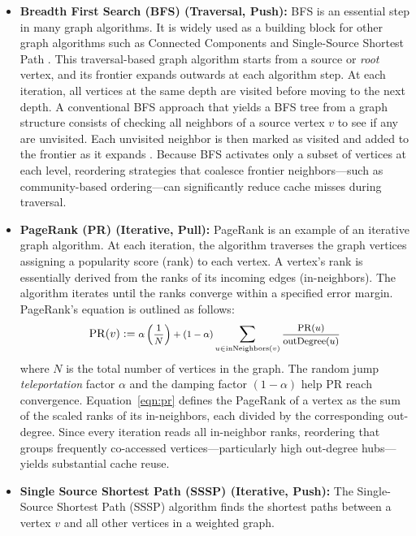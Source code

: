 \documentclass[sigconf, nonacm]{acmart}
\DeclareMathOperator{\PR}{PR}
\DeclareMathOperator{\inNeighbors}{inNeighbors}
\DeclareMathOperator{\outDegree}{outDegree}
\DeclareMathOperator*{\Sum}{\mathlarger{\sum}}
\begin{document}
\begin{itemize}[topsep=2pt,itemsep=2pt,wide]
\item \textbf{Breadth First Search (BFS) (Traversal, Push): }
BFS is an essential step in many graph algorithms. It is widely used as a building block for other graph algorithms such as Connected Components and Single-Source Shortest Path \cite{beamer_direction-optimizing_2012}.
This traversal-based graph algorithm starts from a source or \emph{root} vertex, and its frontier expands outwards at each algorithm step. At each iteration, all vertices at the same depth are visited before moving to the next depth. A conventional BFS approach that yields a BFS tree from a graph structure consists of checking all neighbors of a source vertex $v$ to see if any are unvisited. Each unvisited neighbor is then marked as visited and added to the frontier as it expands \cite{beamer_gap_2017,besta_push_2017}. Because BFS activates only a subset of vertices at each level, reordering strategies that coalesce frontier neighbors---such as community-based ordering---can significantly reduce cache misses during traversal.

\item \textbf{PageRank (PR) (Iterative, Pull): }
PageRank \cite{page_pagerank_1999,brin_anatomy_1998,bianchini_inside_2005,beamer_gap_2017} is an example of an iterative graph algorithm. At each iteration, the algorithm traverses the graph vertices assigning a popularity score (rank) to each vertex. A vertex's rank is essentially derived from the ranks of its incoming edges (in-neighbors). The algorithm iterates until the ranks converge within a specified error margin. PageRank's equation is outlined as follows:
\begin{equation}\label{eqn:pr}
	{
		\PR(v) := \text{\footnotesize $  \alpha \left ( \frac{1}{N} \right ) +(1-\alpha) \Sum_{u\in \inNeighbors(v)} \frac{\PR(u)}{\outDegree(u)} $}
	}
\end{equation} %
where ${N}$ is the total number of vertices in the graph. The random jump \emph{teleportation} factor $\alpha$ and the damping factor $(1-\alpha)$ help PR reach convergence. Equation~\eqref{eqn:pr} defines the PageRank of a vertex as the sum of the scaled ranks of its in-neighbors, each divided by the corresponding out-degree. Since every iteration reads all in-neighbor ranks, reordering that groups frequently co-accessed vertices---particularly high out-degree hubs---yields substantial cache reuse.

\item \textbf{Single Source Shortest Path (SSSP) (Iterative, Push): }
The Single-Source Shortest Path (SSSP) algorithm finds the shortest paths between a vertex $v$ and all other vertices in a weighted graph.


\end{itemize}
\end{document}
